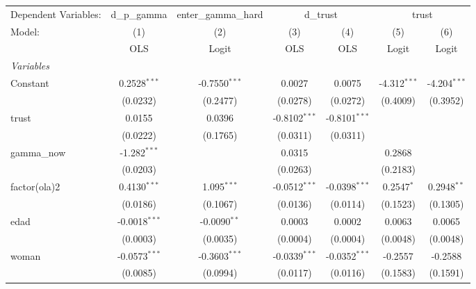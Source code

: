 
\begingroup
\centering
\begin{tabular}{lcccccc}
   \tabularnewline \midrule \midrule
   Dependent Variables: & d\_p\_gamma & enter\_gamma\_hard & \multicolumn{2}{c}{d\_trust} & \multicolumn{2}{c}{trust}\\
   Model:               & (1)             & (2)             & (3)             & (4)             & (5)            & (6)\\  
                        &  OLS            & Logit           & OLS             & OLS             & Logit          & Logit\\  
   \midrule
   \emph{Variables}\\
   Constant             & 0.2528$^{***}$  & -0.7550$^{***}$ & 0.0027          & 0.0075          & -4.312$^{***}$ & -4.204$^{***}$\\   
                        & (0.0232)        & (0.2477)        & (0.0278)        & (0.0272)        & (0.4009)       & (0.3952)\\   
   trust                & 0.0155          & 0.0396          & -0.8102$^{***}$ & -0.8101$^{***}$ &                &   \\   
                        & (0.0222)        & (0.1765)        & (0.0311)        & (0.0311)        &                &   \\   
   gamma\_now           & -1.282$^{***}$  &                 & 0.0315          &                 & 0.2868         &   \\   
                        & (0.0203)        &                 & (0.0263)        &                 & (0.2183)       &   \\   
   factor(ola)2         & 0.4130$^{***}$  & 1.095$^{***}$   & -0.0512$^{***}$ & -0.0398$^{***}$ & 0.2547$^{*}$   & 0.2948$^{**}$\\   
                        & (0.0186)        & (0.1067)        & (0.0136)        & (0.0114)        & (0.1523)       & (0.1305)\\   
   edad                 & -0.0018$^{***}$ & -0.0090$^{**}$  & 0.0003          & 0.0002          & 0.0063         & 0.0065\\   
                        & (0.0003)        & (0.0035)        & (0.0004)        & (0.0004)        & (0.0048)       & (0.0048)\\   
   woman                & -0.0573$^{***}$ & -0.3603$^{***}$ & -0.0339$^{***}$ & -0.0352$^{***}$ & -0.2557        & -0.2588\\   
                        & (0.0085)        & (0.0994)        & (0.0117)        & (0.0116)        & (0.1583)       & (0.1591)\\   

\end{tabular}
